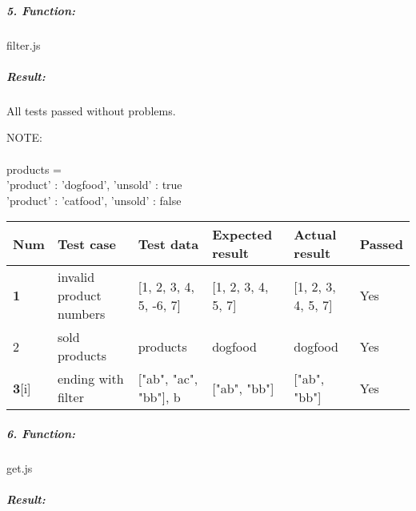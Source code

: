 \documentclass[a4paper, 12pt]{article}
\begin{document}
		
		
		\newpage
		
		\hypertarget{header-n148}{%
		\subparagraph{5. Function:}\label{header-n148}}
		
		filter.js
		
		\hypertarget{header-n168}{%
		\subparagraph{Result:}\label{header-n168}}
		
		All tests passed without problems.
		
		\vspace{0.5cm}
		NOTE:
\\
\\
products = 
		\\
		'product' : 'dogfood', 'unsold' : true
		\\
		'product' : 'catfood', 'unsold' : false
		
		
		\begin{table}[h!]
	        \begin{tabular}{|l|p{3cm}|p{2cm}|p{2cm}|p{2.5cm}|l|}
		\hline
		Num & Test case        				                    	& Test data 					             & Expected result 					    & Actual result 		                    & Passed    \\ \hline
		\textbf{1}                  & invalid product numbers 					& {[{1, 2, 3, 4, 5, -6, 7}]}     	        & {[{1, 2, 3, 4, 5, 7}]}             	& {[{1, 2, 3, 4, 5, 7}]}            		& Yes       \\ \hline
		2                           & sold products  				        	& products                                              & dogfood             	                & dogfood            		                & Yes       \\ \hline
		 \textbf{3}[i]               & ending with filter  				        &  ["ab", "ac", "bb"], b                                   & ["ab", "bb"]             	                & ["ab", "bb"]            		            & Yes       \\ \hline
	        \end{tabular}
        \end{table}



		\hypertarget{header-n202}{%
		\subparagraph{6. Function:}\label{header-n202}}
		
		get.js
		

		
		\hypertarget{header-n218}{%
		\subparagraph{Result:}\label{header-n218}}
		
\end{document}
